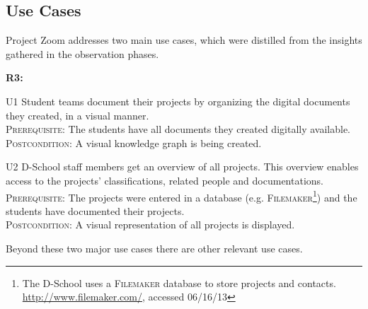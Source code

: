 \subsection{Use Cases}
Project Zoom addresses two main use cases, which were distilled from the insights gathered in the observation phases.

\begin{labeling}{\textbf{R3:}}
\item[U1\label{uc:organize}] Student teams document their projects by organizing the digital documents they created, in a visual manner.\\
\textsc{Prerequisite}: The students have all documents they created digitally available.\\
\textsc{Postcondition}: A visual knowledge graph is being created.

\item[U2\label{uc:display}] D-School staff members get an overview of all projects. This overview enables access to the projects' classifications, related people and documentations.\\
\textsc{Prerequisite}: The projects were entered in a database (e.g. \textsc{Filemaker}\footnote{The D-School uses a \textsc{Filemaker} database to store projects and contacts. \url{http://www.filemaker.com/}, accessed 06/16/13}) and the students have documented their projects.\\
\textsc{Postcondition}: A visual representation of all projects is displayed.
\end{labeling}

Beyond these two major use cases there are other relevant use cases.

